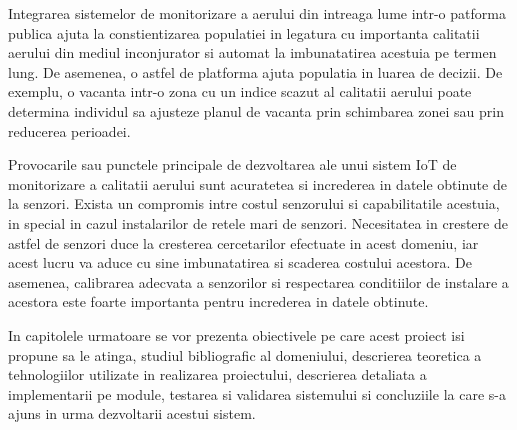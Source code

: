 Integrarea sistemelor de monitorizare a aerului din intreaga lume intr-o patforma publica ajuta la constientizarea populatiei in legatura cu importanta calitatii 
aerului din mediul inconjurator si automat la imbunatatirea acestuia pe termen lung. De asemenea, o astfel de platforma ajuta populatia in luarea de decizii. 
De exemplu, o vacanta intr-o zona cu un indice scazut al calitatii aerului poate determina individul sa ajusteze planul de vacanta prin schimbarea zonei sau prin 
reducerea perioadei.

Provocarile sau punctele principale de dezvoltarea ale unui sistem IoT de monitorizare a calitatii aerului sunt acuratetea si increderea in datele obtinute 
de la senzori. Exista un compromis intre costul senzorului si capabilitatile acestuia, in special in cazul instalarilor de retele mari de senzori. Necesitatea in 
crestere de astfel de senzori duce la cresterea cercetarilor efectuate in acest domeniu, iar acest lucru va aduce cu sine imbunatatirea si scaderea costului acestora. 
De asemenea, calibrarea adecvata a senzorilor si respectarea conditiilor de instalare a acestora este foarte importanta pentru increderea in datele obtinute.

In capitolele urmatoare se vor prezenta obiectivele pe care acest proiect isi propune sa le atinga, studiul bibliografic al domeniului, descrierea teoretica 
a tehnologiilor utilizate in realizarea proiectului, descrierea detaliata a implementarii pe module, testarea si validarea sistemului si concluziile la care s-a 
ajuns in urma dezvoltarii acestui sistem.

